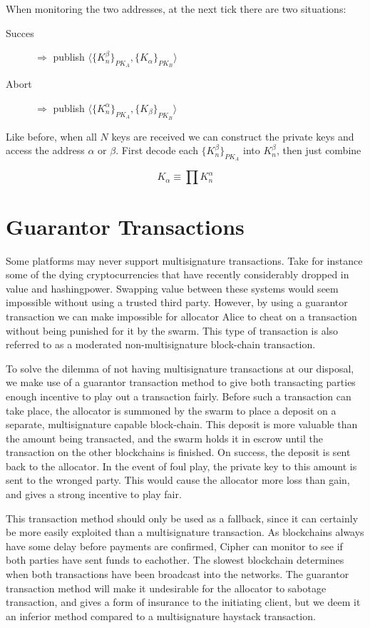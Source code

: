 \documentclass[a4paper,fullpack]{article}
\newcommand{\crypt}[1]{\ensuremath{ {\lbrace {#1} \rbrace} } }
\begin{document}
When monitoring the two addresses, at the next tick there are two situations:

\begin{description}
\item[Succes] $\Rightarrow$ publish $\langle \crypt{K_n^\beta}_{PK_A}, \crypt{K_\alpha}_{PK_B} \rangle$
\item[Abort] $\Rightarrow$ publish $\langle \crypt{K_n^\alpha}_{PK_A}, \crypt{K_\beta}_{PK_B} \rangle$
\end{description}

Like before, when all $N$ keys are received we can construct the private keys and access the address $\alpha$ or $\beta$. First decode each $\crypt{K_n^\beta}_{PK_A}$ into $K_n^\beta$, then just combine

\[
	K_\alpha \equiv \prod K_n^\alpha
\]


\section{Guarantor Transactions}

Some platforms may never support multisignature transactions. Take for instance some of the dying cryptocurrencies that have recently considerably dropped in value and hashingpower. Swapping value between these systems would seem impossible without using a trusted third party. However, by using a guarantor transaction we can make impossible for allocator Alice to cheat on a transaction without being punished for it by the swarm. This type of transaction is also referred to as a moderated non-multisignature block-chain transaction.

To solve the dilemma of not having multisignature transactions at our disposal, we make use of a guarantor transaction method to give both transacting parties enough incentive to play out a transaction fairly. Before such a transaction can take place, the allocator is summoned by the swarm to place a deposit on a separate, multisignature capable block-chain. This deposit is more valuable than the amount being transacted, and the swarm holds it in escrow until the transaction on the other blockchains is finished. On success, the deposit is sent back to the allocator. In the event of foul play, the private key to this amount is sent to the wronged party. This would cause the allocator more loss than gain, and gives a strong incentive to play fair.

This transaction method should only be used as a fallback, since it can certainly be more easily exploited than a multisignature transaction. As blockchains always have some delay before payments are confirmed, Cipher can monitor to see if both parties have sent funds to eachother. The slowest blockchain determines when both transactions have been broadcast into the networks. The guarantor transaction method will make it undesirable for the allocator to sabotage transaction, and gives a form of insurance to the initiating client, but we deem it an inferior method compared to a multisignature haystack transaction.
\end{document}
